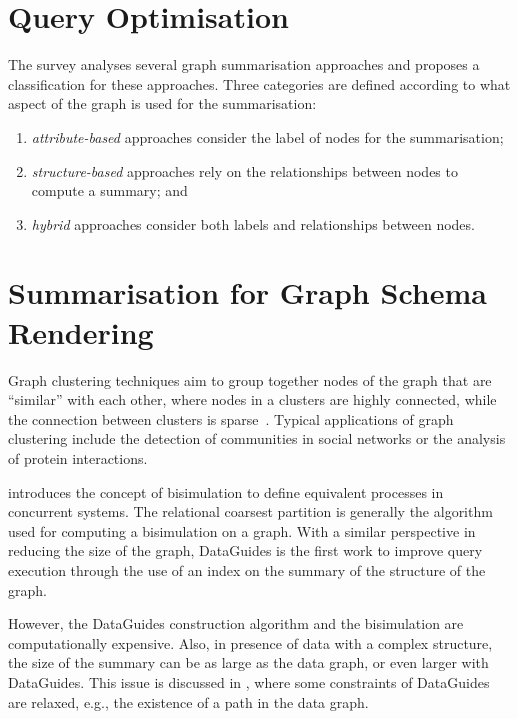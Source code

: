 \section{Query Optimisation}


The survey \cite{you:2013:towards} analyses several graph summarisation approaches and proposes a classification for these approaches. Three categories are defined according to what aspect of the graph is used for the summarisation:
\begin{enumerate}
\item \emph{attribute-based} approaches consider the label of nodes for the summarisation;
\item \emph{structure-based} approaches rely on the relationships between nodes to compute a summary; and
\item \emph{hybrid} approaches consider both labels and relationships between nodes.
\end{enumerate}

\section{Summarisation for Graph Schema Rendering}

Graph clustering techniques aim to group together nodes of the graph that are ``similar'' with each other, where nodes in a clusters are highly connected, while the connection between clusters is sparse~\cite{Schaeffer:2007:SGC}. Typical applications of graph clustering include the detection of communities in social networks or the analysis of protein interactions.

\cite{Milner:1989:CC:534666} introduces the concept of bisimulation to define equivalent processes in concurrent systems. The relational coarsest partition \cite{Paige:1987:TPR:37185.37186} is generally the algorithm used for computing a bisimulation on a graph. With a similar perspective in reducing the size of the graph, DataGuides \cite{goldman1997dataguides} is the first work to improve query execution through the use of an index on the summary of the structure of the graph.

However, the DataGuides construction algorithm and the bisimulation are computationally expensive. Also, in presence of data with a complex structure, the size of the summary can be as large as the data graph, or even larger with DataGuides. This issue is discussed in \cite{goldman1999approximate}, where some constraints of DataGuides are relaxed, e.g., the existence of a path in the data graph.

